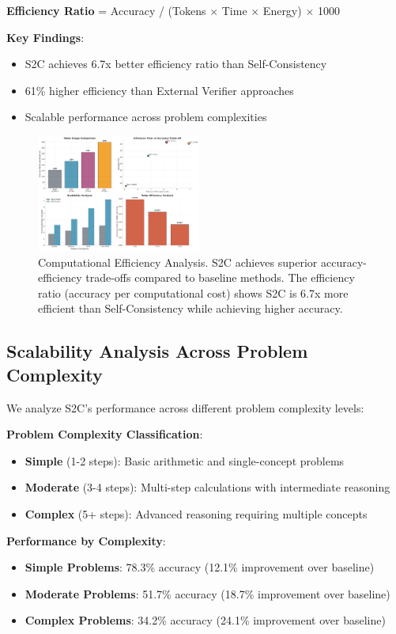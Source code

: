 \documentclass[10pt,twocolumn]{article}
\newcommand{\ssc}{\textsc{S2C}}
\begin{document}
\textbf{Efficiency Ratio} = Accuracy / (Tokens $\times$ Time $\times$ Energy) $\times$ 1000

\textbf{Key Findings}:
\begin{itemize}
\item \ssc{} achieves 6.7x better efficiency ratio than Self-Consistency
\item 61\% higher efficiency than External Verifier approaches
\item Scalable performance across problem complexities
\end{itemize}

\begin{figure}[t]
\centering
\includegraphics[width=0.48\textwidth]{graphs/computational_efficiency.pdf}
\caption{Computational Efficiency Analysis. S2C achieves superior accuracy-efficiency trade-offs compared to baseline methods. The efficiency ratio (accuracy per computational cost) shows S2C is 6.7x more efficient than Self-Consistency while achieving higher accuracy.}
\label{fig:efficiency}
\end{figure}

\subsection{Scalability Analysis Across Problem Complexity}

We analyze \ssc{}'s performance across different problem complexity levels:

\textbf{Problem Complexity Classification}:
\begin{itemize}
\item \textbf{Simple} (1-2 steps): Basic arithmetic and single-concept problems
\item \textbf{Moderate} (3-4 steps): Multi-step calculations with intermediate reasoning
\item \textbf{Complex} (5+ steps): Advanced reasoning requiring multiple concepts
\end{itemize}

\textbf{Performance by Complexity}:
\begin{itemize}
\item \textbf{Simple Problems}: 78.3\% accuracy (12.1\% improvement over baseline)
\item \textbf{Moderate Problems}: 51.7\% accuracy (18.7\% improvement over baseline)
\item \textbf{Complex Problems}: 34.2\% accuracy (24.1\% improvement over baseline)
\end{itemize}
\end{document}
